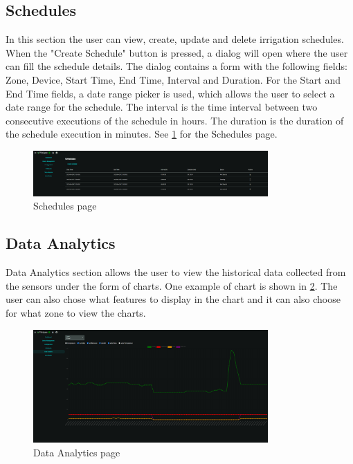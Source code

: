 \subsection{Schedules}
In this section the user can view, create, update and delete irrigation schedules. When the "Create Schedule" button is pressed, a dialog
will open where the user can fill the schedule details. The dialog contains a form with the following fields:
Zone, Device, Start Time, End Time, Interval and Duration. For the Start and End Time fields, a date range picker is used,
which allows the user to select a date range for the schedule. The interval is the time interval between two consecutive executions of the schedule in hours.
The duration is the duration of the schedule execution in minutes. See \ref{fig:schedules-page} for the Schedules page. 

\begin{figure}[H]
    \centering
    \includegraphics[width=0.8\textwidth]{images/schedules.png}
    \caption{Schedules page}
    \label{fig:schedules-page}
\end{figure}

\subsection{Data Analytics}
Data Analytics section allows the user to view the historical data collected from the sensors under the form of charts. One example 
of chart is shown in \ref{fig:analytics-page}. The user can also chose what features to display in the chart and it can also choose for what zone to
view the charts. 
\begin{figure}[H]
    \centering
    \includegraphics[width=0.8\textwidth]{images/analytics.png}
    \caption{Data Analytics page}
    \label{fig:analytics-page}
\end{figure}

